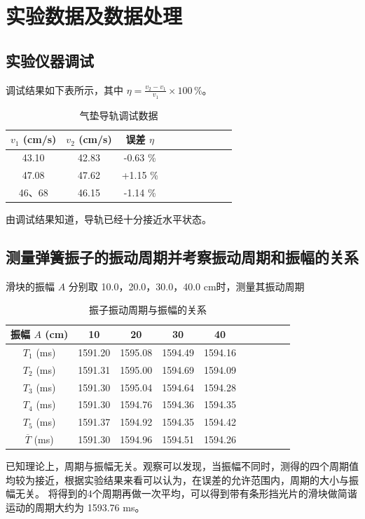 \documentclass[UTF8]{article}
\theoremstyle{MyLineTheoremStyle} %
\theoremstyle{MyBlockTheoremStyle} %
\theoremstyle{MySubsubsectionStyle} %
\begin{document}
\section{实验数据及数据处理}

\subsection{实验仪器调试}
调试结果如下表所示，其中 $\eta = \frac{v_2 - v_1}{v_1} \times 100 \,\%$。
\begin{table}[H]\centering
    \caption{气垫导轨调试数据}
    \label{气垫导轨调试数据}
\begin{tabular}{cccccccccc}\toprule
    $v_1$ (cm/s)& $v_2$ (cm/s)& 误差 $\eta$  \\
    \midrule
    43.10	&42.83	&-0.63 \% \\
    47.08	&47.62	&+1.15 \% \\
    46、68	&46.15	&-1.14 \% \\
    \bottomrule
\end{tabular}
\end{table}

由调试结果知道，导轨已经十分接近水平状态。

\subsection{测量弹簧振子的振动周期并考察振动周期和振幅的关系}
    滑块的振幅 $A$ 分别取 10.0，20.0，30.0，40.0 cm时，测量其振动周期
\begin{table}[H]\centering
    \caption{振子振动周期与振幅的关系}
    \label{振子振动周期与振幅的关系}
\begin{tabular}{cccccccccc}\toprule
    振幅 $A$ (cm) & 10 & 20 & 30 & 40  \\
    \midrule
    $T_1$ (ms) &1591.20	&1595.08	&1594.49	&1594.16 \\
    $T_2$ (ms) &1591.31	&1595.00	&1594.69	&1594.09 \\
    $T_3$ (ms) &1591.30	&1595.04	&1594.64	&1594.28 \\
    $T_4$ (ms) &1591.30	&1594.76	&1594.36	&1594.35 \\
    $T_5$ (ms) &1591.37	&1594.92	&1594.35	&1594.42 \\
    $\overline{T}$ (ms) &1591.30	&1594.96	&1594.51	&1594.26 \\
    \bottomrule
\end{tabular}
\end{table}
    已知理论上，周期与振幅无关。观察可以发现，当振幅不同时，测得的四个周期值均较为接近，根据实验结果来看可以认为，在误差的允许范围内，周期的大小与振幅无关。
    将得到的4个周期再做一次平均，可以得到带有条形挡光片的滑块做简谐运动的周期大约为 1593.76 ms。
\end{document}
